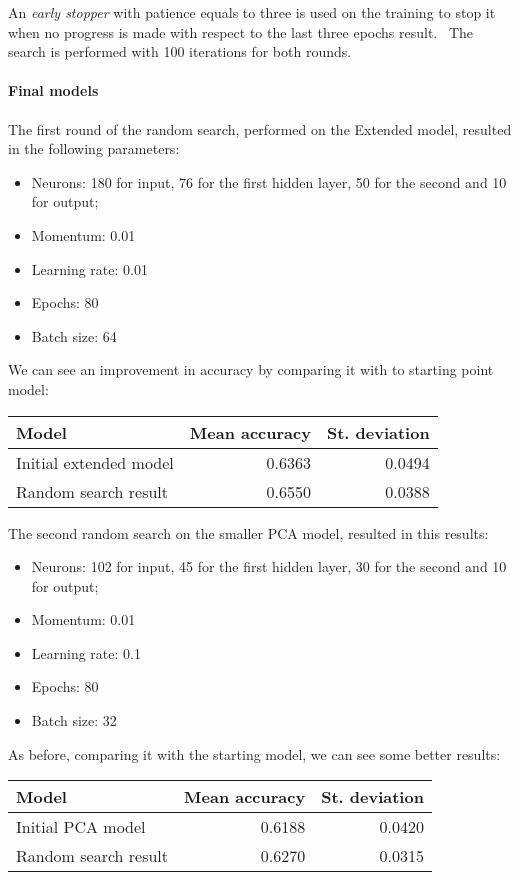 An \emph{early stopper} with patience equals to three is used on the training to stop it when no progress is made with 
respect to the last three epochs result.~\cite{early}
The search is performed with 100 iterations for both rounds.

\paragraph{Final models}
The first round of the random search, performed on the Extended model, resulted 
in the following parameters:
\begin{itemize}
    \item Neurons: 180 for input, 76 for the first hidden layer, 50 for the second and 10 for output;
    \item Momentum: 0.01
    \item Learning rate: 0.01
    \item Epochs: 80
    \item Batch size: 64
\end{itemize}
We can see an improvement in accuracy by comparing it with to starting point model:
\begin{center}
    \begin{tabular}{ |l|r|r| } 
        \hline
        Model & Mean accuracy & St. deviation \\
        \hline
        Initial extended model & 0.6363 & 0.0494\\
        Random search result & 0.6550 & 0.0388\\
        \hline
    \end{tabular}
\end{center}

The second random search on the smaller PCA model, resulted in this results:
\begin{itemize}
    \item Neurons: 102 for input, 45 for the first hidden layer, 30 for the second and 10 for output;
    \item Momentum: 0.01
    \item Learning rate: 0.1
    \item Epochs: 80
    \item Batch size: 32
\end{itemize}
As before, comparing it with the starting model, we can see some better results:
\begin{center}
    \begin{tabular}{ |l|r|r| } 
        \hline
        Model & Mean accuracy & St. deviation \\
        \hline
        Initial PCA model & 0.6188 & 0.0420\\
        Random search result & 0.6270 & 0.0315\\
        \hline
    \end{tabular}
\end{center}

